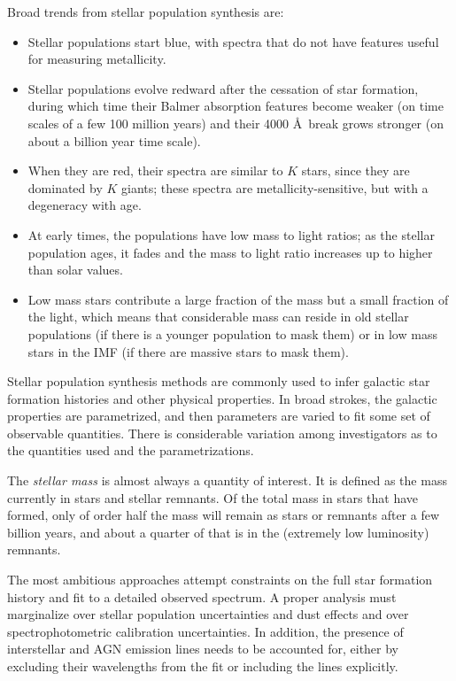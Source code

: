 Broad trends from stellar population synthesis are:
\begin{itemize}
\item Stellar populations start blue, with spectra that do not
have features useful for measuring metallicity.
\item Stellar populations evolve redward after the cessation of star
formation, during which time their Balmer absorption features become
weaker (on time scales of a few 100 million years) and their 4000 \AA\
break grows stronger (on about a billion year time scale).
\item When they are red, their spectra are similar to $K$ stars, since
they are dominated by $K$ giants; these spectra are
metallicity-sensitive, but with a degeneracy with age.
\item At early times, the populations have low mass to light ratios;
as the stellar population ages, it fades and the mass to light ratio
increases up to higher than solar values.
\item Low mass stars contribute a large fraction of the mass but a
small fraction of the light, which means that considerable mass can
reside in old stellar populations (if there is a younger population to
mask them) or in low mass stars in the IMF (if there are massive stars
to mask them).
\end{itemize}

Stellar population synthesis methods are commonly used to infer
galactic star formation histories and other physical properties.
In broad strokes, the galactic properties are parametrized, and then
parameters are varied to fit some set of observable quantities. There
is considerable variation among investigators as to the quantities
used and the parametrizations.

The {\it stellar mass} is almost always a quantity of interest. It is
defined as the mass currently in stars and stellar remnants. Of the
total mass in stars that have formed, only of order half the mass will
remain as stars or remnants after a few billion years, and about a
quarter of that is in the (extremely low luminosity) remnants.

The most ambitious approaches attempt constraints on the full star
formation history and fit to a detailed observed spectrum. A proper
analysis must marginalize over stellar population uncertainties and
dust effects and over spectrophotometric calibration uncertainties. In
addition, the presence of interstellar and AGN emission lines needs to
be accounted for, either by excluding their wavelengths from the fit
or including the lines explicitly.

